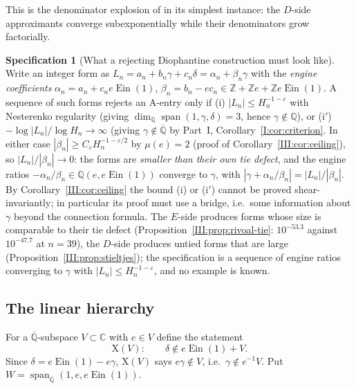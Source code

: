 \documentclass[11pt,a4paper]{article}
\newcommand{\Q}{\mathbb Q}
\newcommand{\Z}{\mathbb Z}
\newcommand{\C}{\mathbb C}
\newcommand{\Qbar}{\overline{\mathbb Q}}
\newcommand{\Ein}{\operatorname{Ein}}
\DeclareMathOperator{\spn}{span}
\theoremstyle{definition}
\newtheorem{specification}[theorem]{Specification}
\theoremstyle{remark}
\numberwithin{equation}{section}
\begin{document}
This is the denominator explosion of \cite{K001} in its simplest instance: the $D$-side
approximants converge subexponentially while their denominators grow factorially.

\begin{specification}[What a rejecting Diophantine construction must look like]\label{III:spec}
Write an integer form as $L_n=a_n+b_n\gamma+c_n\delta=\alpha_n+\beta_n\gamma$ with the
\emph{engine coefficients} $\alpha_n=a_n+c_ne\Ein(1)$, $\beta_n=b_n-ec_n\in\Z+\Z e+\Z e\Ein(1)$.
A sequence of such forms rejects an $\mathrm A$-entry only if (i)
$|L_n|\le H_n^{-1-\varepsilon}$ with Nesterenko regularity (giving
$\dim_\Q\spn(1,\gamma,\delta)=3$, hence $\gamma\notin\Q$), or (i$'$)
$-\log|L_n|/\log H_n\to\infty$ (giving $\gamma\notin\Qbar$ by Part~I, Corollary~\ref{I:cor:criterion}.
In either case $|\beta_n|\ge C_\varepsilon H_n^{-1-\varepsilon/2}$ by $\mu(e)=2$ (proof of
Corollary~\ref{III:cor:ceiling}), so $|L_n|/|\beta_n|\to0$: the forms are \emph{smaller than
their own tie defect}, and the engine ratios $-\alpha_n/\beta_n\in\Q(e,e\Ein(1))$
converge to $\gamma$, with $|\gamma+\alpha_n/\beta_n|=|L_n|/|\beta_n|$. By
Corollary~\ref{III:cor:ceiling} the bound (i) or (i$'$) cannot be proved shear-invariantly;
in particular its proof must use a bridge, i.e.\ some information about $\gamma$ beyond
the connection formula. The $E$-side produces forms whose size is comparable to their tie defect
(Proposition~\ref{III:prop:rivoal-tie}: $10^{-53.3}$ against $10^{-47.7}$ at $n=39$), the
$D$-side produces untied forms that are large (Proposition~\ref{III:prop:stieltjes}); the specification is a
sequence of engine ratios converging to $\gamma$ with $|L_n|\le H_n^{-1-\varepsilon}$, and no
example is known.
\end{specification}

\subsection{The linear hierarchy}

For a $\Qbar$-subspace $V\subset\C$ with $e\in V$ define the statement
\[
 \mathrm X(V):\qquad \delta\notin e\Ein(1)+V .
\]
Since $\delta=e\Ein(1)-e\gamma$, $\mathrm X(V)$ says $e\gamma\notin V$, i.e.\
$\gamma\notin e^{-1}V$. Put $W=\spn_{\Qbar}(1,e,e\Ein(1))$.
\end{document}
